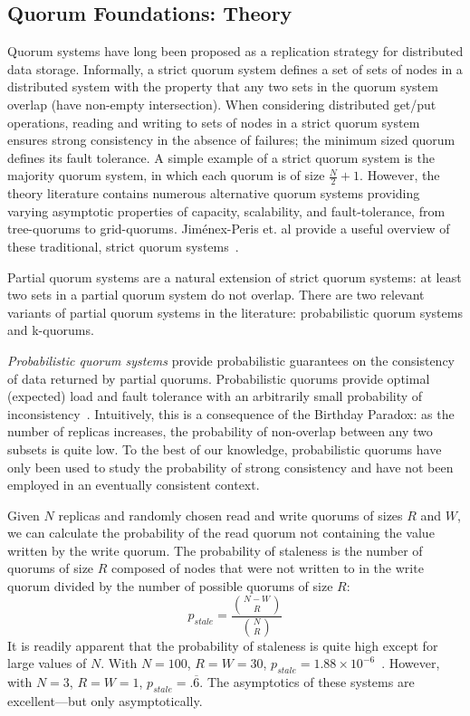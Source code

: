 \documentclass{vldb}
\begin{document}
\subsection{Quorum Foundations: Theory}

Quorum systems have long been proposed as a replication strategy for
distributed data storage.  Informally, a strict quorum system defines
a set of sets of nodes in a distributed system with the property that
any two sets in the quorum system overlap (have non-empty
intersection).  When considering distributed get/put operations,
reading and writing to sets of nodes in a strict quorum system ensures
strong consistency in the absence of failures; the minimum sized
quorum defines its fault tolerance.  A simple example of a strict
quorum system is the majority quorum system, in which each quorum is
of size $\frac{N}{2}+1$.  However, the theory literature contains
numerous alternative quorum systems providing varying asymptotic
properties of capacity, scalability, and fault-tolerance, from
tree-quorums to grid-quorums.  Jim\'{e}nex-Peris et. al provide a
useful overview of these traditional, strict quorum
systems~\cite{quorums-alternative}.

Partial quorum systems are a natural extension of strict quorum
systems: at least two sets in a partial quorum system do not
overlap.  There are two relevant variants of partial quorum systems in
the literature: probabilistic quorum systems and k-quorums.

\textit{Probabilistic quorum systems} provide probabilistic guarantees
on the consistency of data returned by partial quorums.
Probabilistic quorums provide optimal (expected) load and fault
tolerance with an arbitrarily small probability of
inconsistency~\cite{prob-quorum}.  Intuitively, this is a consequence
of the Birthday Paradox: as the number of replicas increases, the
probability of non-overlap between any two subsets is quite low.  To
the best of our knowledge, probabilistic quorums have only been used
to study the probability of strong consistency and have not been
employed in an eventually consistent context.

Given $N$ replicas and randomly chosen read and write quorums of sizes
$R$ and $W$, we can calculate the probability of the read quorum not
containing the value written by the write quorum.  The probability of
staleness is the number of quorums of size $R$ composed of nodes that
were not written to in the write quorum divided by the number of
possible quorums of size $R$:
\begin{equation}
\label{eq:prob-strict}
p_{stale}=\frac{{N-W \choose R}}{{N \choose R}}
\end{equation}
It is readily apparent that the probability of staleness is quite high
except for large values of $N$.  With $N=100$, $R=W=30$, $p_{stale} =
1.88 \times 10^{-6}$~\cite{nonstrict-availability}.  However, with
$N=3$, $R=W=1$, $p_{stale} = .\overline{6}$.  The asymptotics of these
systems are excellent---but only asymptotically.  
\end{document}

